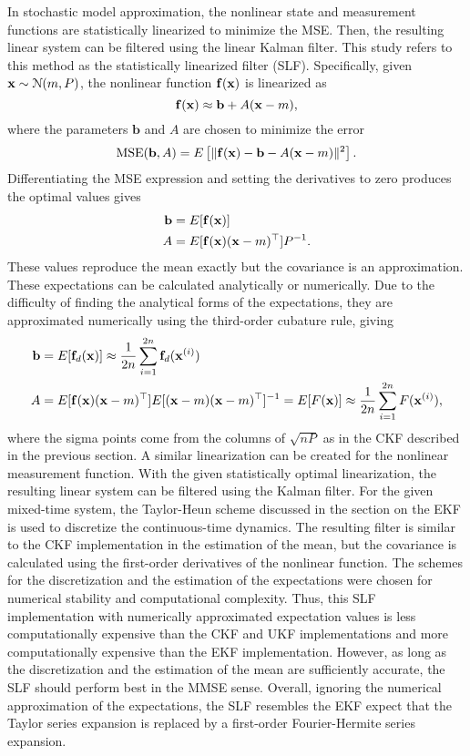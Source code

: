\documentclass[../zhang_thesis.tex]{subfiles}
\begin{document}
In stochastic model approximation, the nonlinear state and measurement functions are statistically linearized to minimize the MSE. Then, the resulting linear system can be filtered using the linear Kalman filter. This study refers to this method as the statistically linearized filter (SLF). Specifically, given $\mathbf{x}\sim\mathcal{N}(m,P)$, the nonlinear function $\mathbf{f}(\mathbf{x})$ is linearized as
\begin{equation}
    \mathbf{f}(\mathbf{x}) \approx \mathbf{b} + A (\mathbf{x} - m),
\end{equation}
where the parameters $\mathbf{b}$ and $A$ are chosen to minimize the error
\begin{equation}
    \text{MSE}(\mathbf{b},A) = E \left[ \| \mathbf{f}(\mathbf{x}) - \mathbf{b} - A(\mathbf{x}-m) \|^2 \right].
\end{equation}
Differentiating the MSE expression and setting the derivatives to zero produces the optimal values gives
\begin{align}
    \mathbf{b} & = E[\mathbf{f}(\mathbf{x})] \\
    A & = E[\mathbf{f}(\mathbf{x}) (\mathbf{x}-m)^\top] P^{-1}.
\end{align}
These values reproduce the mean exactly but the covariance is an approximation. These expectations can be calculated analytically or numerically. Due to the difficulty of finding the analytical forms of the expectations, they are approximated numerically using the third-order cubature rule, giving
\begin{align}
    \mathbf{b} & = E[\mathbf{f}_d(\mathbf{x})] \approx \frac{1}{2n} \sum_{i=1}^{2n} \mathbf{f}_d(\mathbf{x}^{(i)}) \\
    A & = E[\mathbf{f}(\mathbf{x})(\mathbf{x}-m)^\top] E[(\mathbf{x}-m)(\mathbf{x}-m)^\top]^{-1} = E[F(\mathbf{x})] \approx \frac{1}{2n} \sum_{i=1}^{2n} F(\mathbf{x}^{(i)}),
\end{align}
where the sigma points come from the columns of $\sqrt{nP}$ as in the CKF described in the previous section. A similar linearization can be created for the nonlinear measurement function. With the given statistically optimal linearization, the resulting linear system can be filtered using the Kalman filter. For the given mixed-time system, the Taylor-Heun scheme discussed in the section on the EKF is used to discretize the continuous-time dynamics. The resulting filter is similar to the CKF implementation in the
estimation of the mean, but the covariance is calculated using the first-order derivatives of the nonlinear function. The schemes for the discretization and the estimation of the expectations were chosen for numerical stability and computational complexity. Thus, this SLF implementation with numerically approximated expectation values is less computationally expensive than the CKF and UKF implementations and more computationally expensive than the EKF implementation. However, as long as the discretization and the estimation of the mean are sufficiently accurate, the SLF should perform best in the MMSE sense. Overall,
ignoring the numerical approximation of the expectations, the SLF resembles the EKF expect that the Taylor series expansion is replaced by a first-order Fourier-Hermite series expansion.
\end{document}
